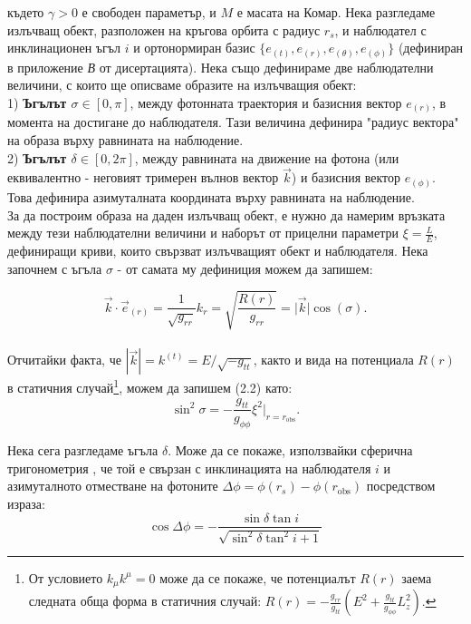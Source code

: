 \documentclass[12pt]{article}
\numberwithin{equation}{section}
\numberwithin{figure}{section}
\begin{document}
	\noindent където $\gamma > 0$ е свободен параметър, и $M$ е масата на Комар. Нека разгледаме излъчващ обект, разположен на кръгова орбита с радиус $r_s$, и наблюдател с инклинационен ъгъл $i$ и ортонормиран базис $\{e_{(t)}, e_{(r)}, e_{(\theta)}, e_{(\phi)}\}$ (дефиниран в приложение \emph{В} от дисертацията). Нека също дефинираме две наблюдателни величини, с които ще описваме образите на излъчващия обект:\\
	
	1) \textbf{Ъгълът $\sigma\in[0,\pi]$}, между фотонната траектория и базисния вектор $e_{(r)}$, в момента на достигане до наблюдателя. Тази величина дефинира "радиус вектора" на образа върху равнината на наблюдение.\\
	
	2) \textbf{Ъгълът $\delta\in[0,2\pi]$}, между равнината на движение на фотона (или еквивалентно - неговият тримерен вълнов вектор $\vec{k}$) и базисния вектор $e_{(\phi)}$. Това дефинира азимуталната координата върху равнината на наблюдение.\\
	
	За да построим образа на даден излъчващ обект, е нужно да намерим връзката между тези наблюдателни величини и наборът от прицелни параметри $\xi = \frac{L}{E}$, дефиниращи криви, които свързват излъчващият обект и наблюдателя. Нека започнем с ъгъла $\sigma$ - от самата му дефиниция можем да запишем:
	
	\begin{equation}
		\vec{k} \cdot \vec{e}_{(r)} = \frac{1}{\sqrt{g_{rr}}}k_{r} = \sqrt{\frac{R(r)}{g_{rr}}} =  \big\vert \vec{k}\big\vert \cos(\sigma).
	\end{equation}\\
	Отчитайки факта, че $|\vec{k}| = k^{(t)} = E/\sqrt{-g_{tt}}$, както и вида на потенциала $R(r)$ в статичния случай\footnote{От условието $k_\mu k^\mu = 0$ може да се покаже, че потенциалът $R(r)$ заема следната обща форма в статичния случай: $R(r) = -\frac{g_{rr}}{g_{tt}}\left(E^2 + \frac{g_{tt}}{g_{\phi\phi}}L_z^2\right)$.}, можем да запишем (2.2) като:
	\begin{equation}
		\sin^2\sigma = -\frac{g_{tt}}{g_{\phi\phi}}\xi^2\bigg\vert_{r = r_\text{obs}}.
	\end{equation}
	
	Нека сега разгледаме ъгъла $\delta$. Може да се покаже, използвайки сферична тригонометрия \cite{Luminet1979}, че той е свързан с инклинацията на наблюдателя $i$ и азимуталното отместване на фотоните $\Delta\phi = \phi(r_s) - \phi(r_\text{obs})$ посредством израза:
	\begin{equation}
		\cos\Delta\phi = - \frac{\sin\delta\tan i}{\sqrt{\sin^2\delta\tan^2 i + 1}}
	\end{equation}
	
\end{document}
